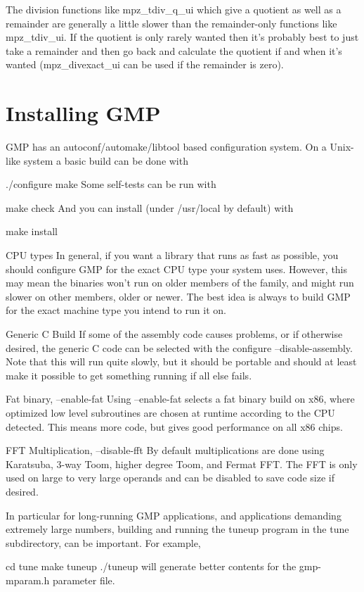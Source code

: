 The division functions like mpz\_tdiv\_q\_ui which give a quotient as well as a
remainder are generally a little slower than the remainder-only functions like
mpz\_tdiv\_ui. If the quotient is only rarely wanted then it's probably best to
just take a remainder and then go back and calculate the quotient if and when
it's wanted (mpz\_divexact\_ui can be used if the remainder is zero). 

\section{Installing GMP}
GMP has an autoconf/automake/libtool based configuration system. On a Unix-like
system a basic build can be done with

     ./configure
     make
Some self-tests can be run with

     make check
And you can install (under /usr/local by default) with

     make install

CPU types
In general, if you want a library that runs as fast as possible, you should
configure GMP for the exact CPU type your system uses. However, this may mean
the binaries won't run on older members of the family, and might run slower on
other members, older or newer. The best idea is always to build GMP for the
exact machine type you intend to run it on.
 
Generic C Build
If some of the assembly code causes problems, or if otherwise desired, the
generic C code can be selected with the configure --disable-assembly.
Note that this will run quite slowly, but it should be portable and should at
least make it possible to get something running if all else fails.

Fat binary, --enable-fat
Using --enable-fat selects a fat binary build on x86, where optimized low level
subroutines are chosen at runtime according to the CPU detected. This means more
code, but gives good performance on all x86 chips.

FFT Multiplication, --disable-fft
By default multiplications are done using Karatsuba, 3-way Toom, higher degree
Toom, and Fermat FFT. The FFT is only used on large to very large operands and
can be disabled to save code size if desired.

In particular for long-running GMP applications, and applications demanding
extremely large numbers, building and running the tuneup program in the tune
subdirectory, can be important. For example,

     cd tune
     make tuneup
     ./tuneup
will generate better contents for the gmp-mparam.h parameter file.


